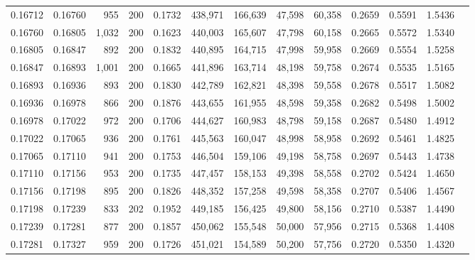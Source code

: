\begin{tabular}{rrrrrrrrrrrrr}
0.16712 & 0.16760 &   955 & 200 &                                     0.1732 & 438,971 & 166,639 &  47,598 &  60,358 & 0.2659 & 0.5591 & 1.5436 \\
0.16760 & 0.16805 & 1,032 & 200 &                                     0.1623 & 440,003 & 165,607 &  47,798 &  60,158 & 0.2665 & 0.5572 & 1.5340 \\
0.16805 & 0.16847 &   892 & 200 &                                     0.1832 & 440,895 & 164,715 &  47,998 &  59,958 & 0.2669 & 0.5554 & 1.5258 \\
0.16847 & 0.16893 & 1,001 & 200 &                                     0.1665 & 441,896 & 163,714 &  48,198 &  59,758 & 0.2674 & 0.5535 & 1.5165 \\
0.16893 & 0.16936 &   893 & 200 &                                     0.1830 & 442,789 & 162,821 &  48,398 &  59,558 & 0.2678 & 0.5517 & 1.5082 \\
0.16936 & 0.16978 &   866 & 200 &                                     0.1876 & 443,655 & 161,955 &  48,598 &  59,358 & 0.2682 & 0.5498 & 1.5002 \\
0.16978 & 0.17022 &   972 & 200 &                                     0.1706 & 444,627 & 160,983 &  48,798 &  59,158 & 0.2687 & 0.5480 & 1.4912 \\
0.17022 & 0.17065 &   936 & 200 &                                     0.1761 & 445,563 & 160,047 &  48,998 &  58,958 & 0.2692 & 0.5461 & 1.4825 \\
0.17065 & 0.17110 &   941 & 200 &                                     0.1753 & 446,504 & 159,106 &  49,198 &  58,758 & 0.2697 & 0.5443 & 1.4738 \\
0.17110 & 0.17156 &   953 & 200 &                                     0.1735 & 447,457 & 158,153 &  49,398 &  58,558 & 0.2702 & 0.5424 & 1.4650 \\
0.17156 & 0.17198 &   895 & 200 &                                     0.1826 & 448,352 & 157,258 &  49,598 &  58,358 & 0.2707 & 0.5406 & 1.4567 \\
0.17198 & 0.17239 &   833 & 202 &                                     0.1952 & 449,185 & 156,425 &  49,800 &  58,156 & 0.2710 & 0.5387 & 1.4490 \\
0.17239 & 0.17281 &   877 & 200 &                                     0.1857 & 450,062 & 155,548 &  50,000 &  57,956 & 0.2715 & 0.5368 & 1.4408 \\
0.17281 & 0.17327 &   959 & 200 &                                     0.1726 & 451,021 & 154,589 &  50,200 &  57,756 & 0.2720 & 0.5350 & 1.4320 \\

\end{tabular}
